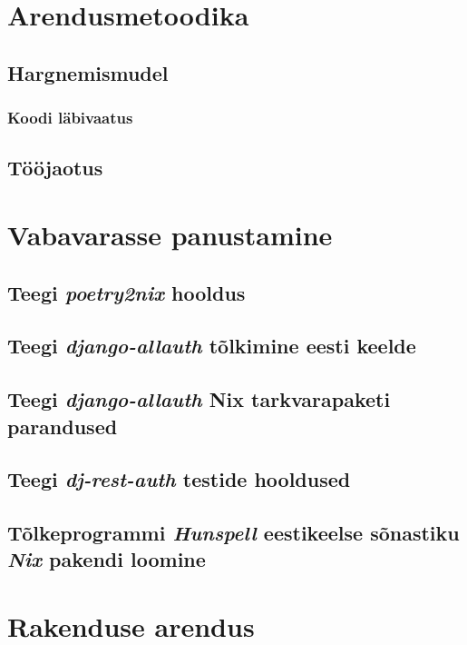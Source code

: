 \section{Arendusmetoodika}

\subsection{Hargnemismudel}

\subsubsection{Koodi läbivaatus}

\subsection{Tööjaotus}


\section{Vabavarasse panustamine}

\subsection{Teegi \textit{poetry2nix} hooldus}

\subsection{Teegi \textit{django-allauth} tõlkimine eesti keelde}

\subsection{Teegi \textit{django-allauth} Nix tarkvarapaketi parandused}

\subsection{Teegi \textit{dj-rest-auth} testide hooldused}

\subsection{Tõlkeprogrammi \textit{Hunspell} eestikeelse sõnastiku \textit{Nix} pakendi loomine}


\section{Rakenduse arendus}

